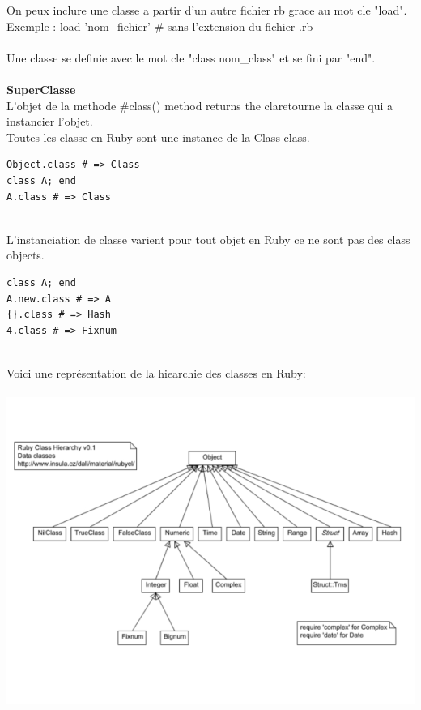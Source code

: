 \documentclass[a4paper,12pt,openany]{book}
\begin{document}
On peux inclure une classe a partir d'un autre fichier rb grace au mot cle "load".\\
Exemple : load 'nom\_fichier' \# sans l'extension du fichier .rb\\
\\
Une classe se definie avec le mot cle "class nom\_class" et se fini par "end".\\
\\
\textbf{SuperClasse}\\
L'objet de la methode #class() method returns the claretourne la classe qui a instancier l'objet.\\
Toutes les classe en Ruby sont une instance de la Class class.\\
\begin{verbatim}  
Object.class # => Class
class A; end
A.class # => Class
\end{verbatim}
\\
L'instanciation de classe varient pour tout objet en Ruby ce ne sont pas des class objects.\\
\begin{verbatim}
class A; end
A.new.class # => A
{}.class # => Hash
4.class # => Fixnum
\end{verbatim}
\\
Voici une représentation de la hiearchie des classes en Ruby:\\
\\
\includegraphics[width=1\linewidth,center]{img/ruby-class-hierachie-data.png}\\
\\
\end{document}
